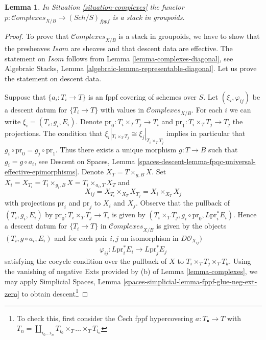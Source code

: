 \documentclass{stacks-project}
\theoremstyle{plain}
\newtheorem{lemma}[subsection]{Lemma}
\theoremstyle{definition}
\theoremstyle{remark}
\numberwithin{equation}{subsection}
\def\Sch{\mathit{Sch}}
\def\Complexesstack{\mathcal{C}\!\mathit{omplexes}}
\begin{document}
\begin{lemma}
\label{lemma-complexes-stack}
In Situation \ref{situation-complexes} the functor
$p : \Complexesstack_{X/B} \longrightarrow (\Sch/S)_{fppf}$
is a stack in groupoids.
\end{lemma}

\begin{proof}
To prove that $\Complexesstack_{X/B}$ is a stack in groupoids,
we have to show that the presheaves $\mathit{Isom}$ are sheaves
and that descent data are effective. The statement on
$\mathit{Isom}$ follows from Lemma \ref{lemma-complexes-diagonal}, see
Algebraic Stacks, Lemma \ref{algebraic-lemma-representable-diagonal}.
Let us prove the statement on descent data.

\medskip\noindent
Suppose that $\{a_i : T_i \to T\}$ is an fppf covering of schemes over $S$.
Let $(\xi_i, \varphi_{ij})$ be a descent datum for $\{T_i \to T\}$
with values in $\Complexesstack_{X/B}$.
For each $i$ we can write $\xi_i = (T_i, g_i, E_i)$.
Denote $\text{pr}_0 : T_i \times_T T_j \to T_i$ and
$\text{pr}_1 : T_i \times_T T_j \to T_j$ the projections.
The condition that $\xi_i|_{T_i \times_T T_j} \cong \xi_j|_{T_i \times_T T_j}$
implies in particular that $g_i \circ \text{pr}_0 = g_j \circ \text{pr}_1$.
Thus there exists a unique morphism $g : T \to B$ such that
$g_i = g \circ a_i$, see
Descent on Spaces, Lemma
\ref{spaces-descent-lemma-fpqc-universal-effective-epimorphisms}.
Denote $X_T = T \times_{g, B} X$. Set
$X_i = X_{T_i} = T_i \times_{g_i, B} X = T_i \times_{a_i, T} X_T$
and
$$
X_{ij} = X_{T_i} \times_{X_T} X_{T_j} = X_i \times_{X_T} X_j
$$
with projections $\text{pr}_i$ and $\text{pr}_j$ to $X_i$ and $X_j$.
Observe that the pullback of $(T_i, g_i, E_i)$
by $\text{pr}_0 : T_i \times_T T_j \to T_i$ is given by
$(T_i \times_T T_j, g_i \circ \text{pr}_0, L\text{pr}_i^*E_i)$.
Hence a descent datum for $\{T_i \to T\}$ in $\Complexesstack_{X/B}$
is given by the objects $(T_i, g \circ a_i, E_i)$
and for each pair $i, j$ an isomorphism in
$D\mathcal{O}_{X_{ij}})$
$$
\varphi_{ij} :
L\text{pr}_i^*E_i \longrightarrow L\text{pr}_j^*E_j
$$
satisfying the cocycle condition over the pullback of $X$ to
$T_i \times_T T_j \times_T T_k$.
Using the vanishing of negative Exts provided by (b) of
Lemma \ref{lemma-complexes}, we may apply
Simplicial Spaces, Lemma \ref{spaces-simplicial-lemma-fppf-glue-neg-ext-zero}
to obtain descent\footnote{To check this, first consider the
{\v C}ech fppf hypercovering $a : T_\bullet \to T$ with
$T_n = \coprod_{i_0 \ldots i_n} T_{i_0} \times_T \ldots \times_T T_{i_n}$
}
\end{proof}
\end{document}
